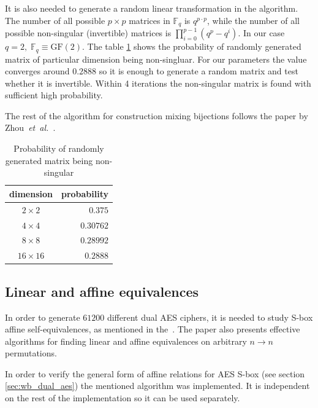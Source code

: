 \documentclass[11pt,oneside,final]{fithesis2}
\newcommand{\gf}{\ensuremath{\text{GF}\left(2\right)}}
\newcommand{\eal}{\emph{et~al.}}
\begin{document}
    It is also needed to generate a random linear transformation in the algorithm. The number of all possible $p \times p$ matrices 
    in $\mathbb{F}_q$ is $q^{p\cdot p}$, while the number of all possible non-singular (invertible) matrices is $\prod_{i=0}^{p-1}(q^p - q^i)$.
    In our case $q=2, \; \mathbb{F}_q \equiv \gf$. The table \ref{tbl:random_matrix_nonsingular_probab} shows the probability of randomly generated matrix of particular 
    dimension being non-singluar. For our parameters the value converges around $0.2888$ so it is enough to generate a random matrix
    and test whether it is invertible. Within 4 iterations the non-singular matrix is found with sufficient high probability.

    The rest of the algorithm for construction mixing bijections follows the paper by Zhou~\eal~\citep{journals/iacr/XiaoZ02}.
    
    \begin{table}[!htb]
    \begin{center}
    \begin{tabular}{ | c | r | }
	\hline
	dimension     & probability    \\ \hline \hline
	$2\times2$    & $0.375$        \\ \hline
	$4\times4$    & $ 0.30762$     \\ \hline
	$8\times8$    & $ 0.28992$     \\ \hline
	$16\times16$  & $ 0.2888$      \\ \hline
    \end{tabular}
    \caption{Probability of randomly generated matrix being non-singular}
    \label{tbl:random_matrix_nonsingular_probab}
    \end{center} 
    \end{table}
    
    \subsection{Linear and affine equivalences}\label{sec:linearAffineEqImpl}
    In order to generate $61200$ different dual AES ciphers, it is needed to study S-box affine self-equivalences, as mentioned in the~\citep{Biryukov:2003:TCL:1766171.1766175}.
    The paper also presents effective algorithms for finding linear and affine equivalences on arbitrary $n \rightarrow n$ permutations. 
    
    In order to verify the general form of affine relations for AES S-box (see section \ref{sec:wb_dual_aes}) the mentioned algorithm was implemented. It is independent 
    on the rest of the implementation so it can be used separately. 
    
\end{document}
